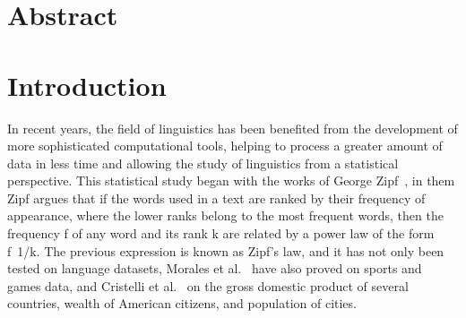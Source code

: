 \documentclass[10pt,letterpaper]{article} %
\begin{document}
\section*{Abstract} %



\linenumbers
\section*{Introduction} %

 
In recent years, the field of linguistics has been benefited from the
development of more sophisticated computational tools, helping to process a
greater amount of data in less time and allowing the study of linguistics  from
a statistical perspective.  This statistical study began with the works of
George Zipf~\cite{Zipf}, in them Zipf argues that if  the words used in a text
are ranked by their frequency of appearance,  where the lower ranks belong to
the most frequent words,  then the frequency  f  of any word and its rank  k
are related by a power law of the form f~1/k. The previous expression is known
as  Zipf’s law, and it has not only been tested on language datasets,  Morales
et al.~\cite{Morales_epj} have also proved on sports and games data,  and
Cristelli et al.~\cite{Cristelli_zipfgdp} on the gross domestic product of several
countries,  wealth of American citizens,  and population of cities.
 
\end{document}
